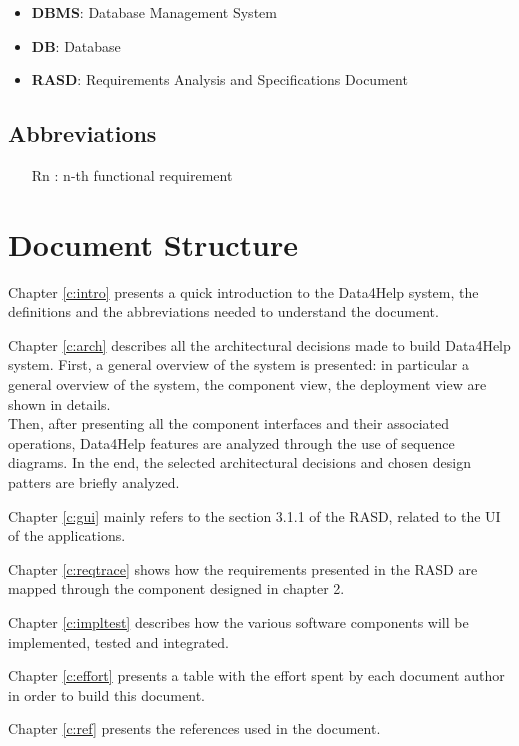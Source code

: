 \begin{itemize}
\item \textbf{DBMS}: Database Management System
\item \textbf{DB}: Database
\item \textbf{RASD}: Requirements Analysis and Specifications Document
\end{itemize}


\subsection{Abbreviations}
\begin{itemize}
\item[Rn]: n-th functional requirement
\end{itemize}



\section{Document Structure}
Chapter \ref{c:intro} presents a quick introduction to the Data4Help system, the definitions and the abbreviations needed to understand the document. 

\bigskip\noindent
Chapter \ref{c:arch} describes all the architectural decisions made to build Data4Help system. First, a general overview of the system is presented: in particular a general overview of the system, the component view, the deployment view are shown in details.\\
Then, after presenting all the component interfaces and their associated operations, Data4Help features are analyzed through the use of sequence diagrams.
In the end, the selected architectural decisions and chosen design patters are briefly analyzed.

\bigskip\noindent
Chapter \ref{c:gui} mainly refers to the section 3.1.1 of the RASD, related to the UI of the applications.

\bigskip\noindent
Chapter \ref{c:reqtrace} shows how the requirements presented in the RASD are mapped through the component designed in chapter 2.



\bigskip\noindent
Chapter \ref{c:impltest} describes how the various software components will be implemented, tested and integrated.

\bigskip\noindent
Chapter \ref{c:effort} presents a table with the effort spent by each document author in order to build this document.

\bigskip\noindent
Chapter \ref{c:ref} presents the references used in the document.